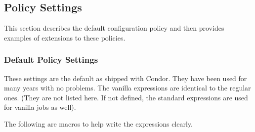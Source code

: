 \subsection{\label{sec:Policy-Settings}Policy Settings}

This section describes the default configuration
policy and then provides examples of extensions to these
policies.

\subsubsection{\label{sec:Default-Policy}Default Policy Settings}

These settings are the default as shipped with Condor.  They have been
used for many years with no problems.  The vanilla expressions are
identical to the regular ones. (They are not listed here.  If
not defined, the standard expressions are used for vanilla jobs
as well).

The following are macros to help write the expressions
clearly.

